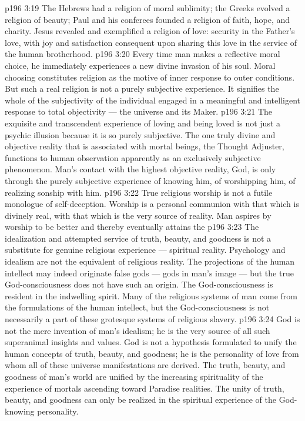 \vs p196 3:19 The Hebrews had a religion of moral sublimity; the Greeks evolved a religion of beauty; Paul and his conferees founded a religion of faith, hope, and charity. Jesus revealed and exemplified a religion of love: security in the Father’s love, with joy and satisfaction consequent upon sharing this love in the service of the human brotherhood.
\vs p196 3:20 Every time man makes a reflective moral choice, he immediately experiences a new divine invasion of his soul. Moral choosing constitutes religion as the motive of inner response to outer conditions. But such a real religion is not a purely subjective experience. It signifies the whole of the subjectivity of the individual engaged in a meaningful and intelligent response to total objectivity --- the universe and its Maker.
\vs p196 3:21 The exquisite and transcendent experience of loving and being loved is not just a psychic illusion because it is so purely subjective. The one truly divine and objective reality that is associated with mortal beings, the Thought Adjuster, functions to human observation apparently as an exclusively subjective phenomenon. Man’s contact with the highest objective reality, God, is only through the purely subjective experience of knowing him, of worshipping him, of realizing sonship with him.
\vs p196 3:22 True religious worship is not a futile monologue of self\hyp{}deception. Worship is a personal communion with that which is divinely real, with that which is the very source of reality. Man aspires by worship to be better and thereby eventually attains the 
\vs p196 3:23 The idealization and attempted service of truth, beauty, and goodness is not a substitute for genuine religious experience --- spiritual reality. Psychology and idealism are not the equivalent of religious reality. The projections of the human intellect may indeed originate false gods --- gods in man’s image --- but the true God\hyp{}consciousness does not have such an origin. The God\hyp{}consciousness is resident in the indwelling spirit. Many of the religious systems of man come from the formulations of the human intellect, but the God\hyp{}consciousness is not necessarily a part of these grotesque systems of religious slavery.
\vs p196 3:24 God is not the mere invention of man’s idealism; he is the very source of all such superanimal insights and values. God is not a hypothesis formulated to unify the human concepts of truth, beauty, and goodness; he is the personality of love from whom all of these universe manifestations are derived. The truth, beauty, and goodness of man’s world are unified by the increasing spirituality of the experience of mortals ascending toward Paradise realities. The unity of truth, beauty, and goodness can only be realized in the spiritual experience of the God\hyp{}knowing personality.

